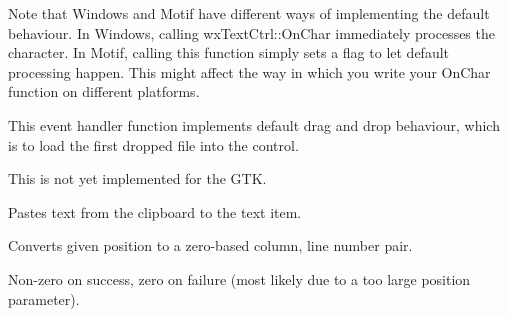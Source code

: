 Note that Windows and Motif have different ways
of implementing the default behaviour. In Windows,
calling wxTextCtrl::OnChar immediately
processes the character. In Motif,
calling this function simply sets a flag
to let default processing happen. This might affect
the way in which you write your OnChar function
on different platforms.



\label{wxtextctrlondropfiles}


This event handler function implements default drag and drop behaviour, which
is to load the first dropped file into the control.




This is not yet implemented for the GTK.



\label{wxtextctrlpaste}


Pastes text from the clipboard to the text item.

\label{wxtextctrlpositiontoxy}


Converts given position to a zero-based column, line number pair.






Non-zero on success, zero on failure (most likely due to a too large position
parameter).



